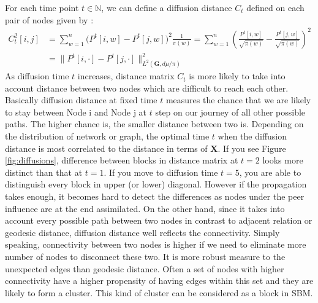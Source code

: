 \documentclass[12pt]{article}
\theoremstyle{definition}
\begin{document}
For each time point $t \in \mathbb{N}$, we can define a diffusion distance $C_{t}$ defined on each pair of nodes given by :	
\begin{equation}
\label{eq:diffusion}
\begin{split}
C^2_{t}[i,j] & = \sum\limits_{w =1}^{n} \big( P^{t}[i,w] - P^{t}[j,w]  \big)^{2} \frac{1}{\pi(w)} = \sum\limits_{w=1}^{n} \left(  \frac{P^{t}[i,w]}{\sqrt{\pi(w)}} - \frac{P^{t}[j,w]}{\sqrt{\pi(w)}}   \right)^2 \\ & = \parallel P^{t}[i, \cdot] - P^{t}[j, \cdot]  \parallel^2_{L^{2}(\boldsymbol{G}, d\mu / \pi)  }
\end{split}
\end{equation}
As diffusion time $t$ increases, distance matrix $C_{t}$ is more likely to take into account distance between two nodes which are difficult to reach each other. Basically diffusion distance at fixed time $t$ measures the chance that we are likely to stay between Node i and Node j at $t$ step on our journey of all other possible paths. The higher chance is, the smaller distance between two is. Depending on the distribution of network or graph, the optimal time $t$ when the diffusion distance is most correlated to the distance in terms of $\mathbf{X}$. If you see Figure \ref{fig:diffusions}, difference between blocks in distance matrix at $t=2$ looks more distinct than that at $t=1$.  If you move to diffusion time $t=5$, you are able to distinguish every block in upper (or lower) diagonal. However if the propagation takes enough, it becomes hard to detect the differences as nodes under the peer influence are at the end assimilated. On the other hand, since it takes into account every possible path between two nodes in contrast to adjacent relation or geodesic distance, diffusion distance well reflects the connectivity. Simply speaking, connectivity between two nodes is higher if we need to eliminate more number of nodes to disconnect these two. It is more robust measure to the unexpected edges than geodesic distance. Often a set of nodes with higher connectivity have a higher propensity of having edges within this set and they are likely to form a cluster. This kind of cluster can be considered as a block in SBM. 
	
\end{document}

